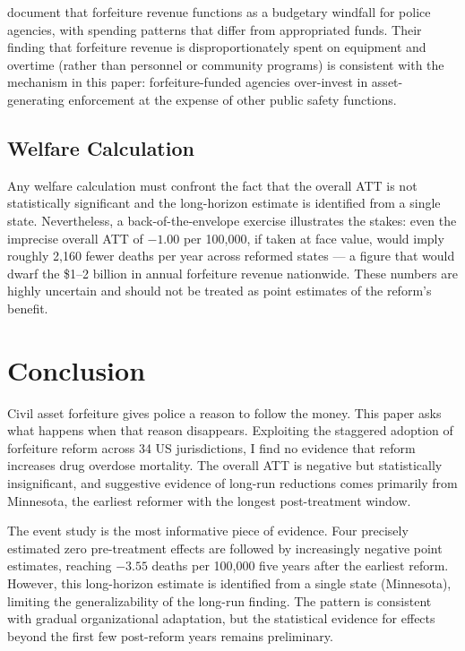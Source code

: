 \documentclass[12pt]{article}
\begin{document}
\citet{caso2022budgetary} document that forfeiture revenue functions as a budgetary windfall for police agencies, with spending patterns that differ from appropriated funds. Their finding that forfeiture revenue is disproportionately spent on equipment and overtime (rather than personnel or community programs) is consistent with the mechanism in this paper: forfeiture-funded agencies over-invest in asset-generating enforcement at the expense of other public safety functions.

\subsection{Welfare Calculation}

Any welfare calculation must confront the fact that the overall ATT is not statistically significant and the long-horizon estimate is identified from a single state. Nevertheless, a back-of-the-envelope exercise illustrates the stakes: even the imprecise overall ATT of $-1.00$ per 100,000, if taken at face value, would imply roughly 2,160 fewer deaths per year across reformed states --- a figure that would dwarf the \$1--2 billion in annual forfeiture revenue nationwide. These numbers are highly uncertain and should not be treated as point estimates of the reform's benefit.


\section{Conclusion}
\label{sec:conclusion}

Civil asset forfeiture gives police a reason to follow the money. This paper asks what happens when that reason disappears. Exploiting the staggered adoption of forfeiture reform across 34 US jurisdictions, I find no evidence that reform increases drug overdose mortality. The overall ATT is negative but statistically insignificant, and suggestive evidence of long-run reductions comes primarily from Minnesota, the earliest reformer with the longest post-treatment window.

The event study is the most informative piece of evidence. Four precisely estimated zero pre-treatment effects are followed by increasingly negative point estimates, reaching $-3.55$ deaths per 100,000 five years after the earliest reform. However, this long-horizon estimate is identified from a single state (Minnesota), limiting the generalizability of the long-run finding. The pattern is consistent with gradual organizational adaptation, but the statistical evidence for effects beyond the first few post-reform years remains preliminary.
\end{document}
